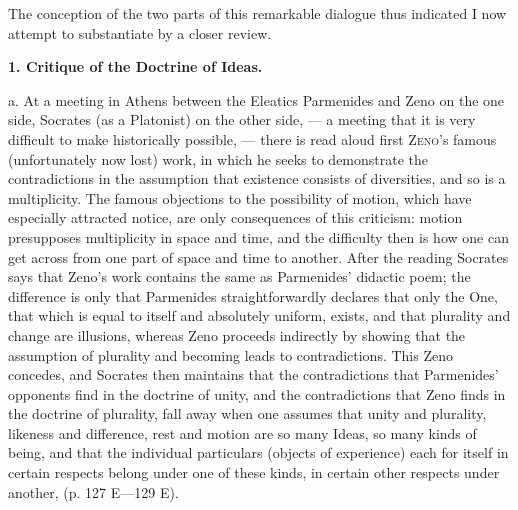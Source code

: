 \documentclass[12pt,a4paper,openany]{book}
\newcommand{\opage}[1]{\marginnote{\footnotesize\textit{[#1]}}}
\newcommand{\chaphead}[1]{\par\bigskip\phantomsection\begin{center}\bfseries #1\end{center}\medskip\ignorespaces}
\begin{document}
The conception of the two parts of this remarkable
dialogue thus indicated I now attempt to substantiate by
a closer review.

\setcounter{footnote}{0}%
\opage{6}\chaphead{1. Critique of the Doctrine of Ideas.}


a. At a meeting in Athens between the Eleatics
Parmenides and Zeno on the one side, Socrates (as a
Platonist) on the other side, --- a meeting that
it is very difficult to make historically possible, --- there is read aloud
first \textsc{Zeno}’s famous (unfortunately now lost) work, in which
he seeks to demonstrate the contradictions in the assumption that
existence consists of diversities, and so is
a multiplicity. The famous objections to the possibility of
motion, which have especially attracted notice, are only consequences
of this criticism: motion presupposes multiplicity
in space and time, and the difficulty then is how
one can get across from one part of space and time to
another. After the reading Socrates says that Zeno’s
work contains the same as Parmenides’ didactic poem;
the difference is only that Parmenides straightforwardly declares that
only the One, that which is equal to itself and absolutely uniform,
exists, and that plurality and change are illusions,
whereas Zeno proceeds indirectly by showing that the assumption
of plurality and becoming leads to contradictions. This
Zeno concedes, and Socrates then maintains that the contradictions
that Parmenides’ opponents find in the doctrine of unity, and the
contradictions that Zeno finds in the doctrine of plurality, fall away
when one assumes that unity and plurality, likeness and difference,
rest and motion are so many Ideas, so many
\setcounter{footnote}{0}%
\opage{7}kinds of being, and that the individual particulars (objects of experience)
each for itself in certain respects belong under
one of these kinds, in certain other respects under another,
(p. 127 E---129 E).
\end{document}

